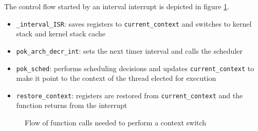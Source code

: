 The control flow started by an interval interrupt is depicted in figure \ref{fig:context switch flow}.
\begin{itemize}
  \item \texttt{\_interval\_ISR}: saves registers to \texttt{current\_context} and switches to kernel stack and kernel stack cache
  \item \texttt{pok\_arch\_decr\_int}: sets the next timer interval and calls the scheduler
  \item \texttt{pok\_sched}: performs scheduling decisions and updates \texttt{current\_context} to make it point to the context of the thread elected for execution
  \item \texttt{restore\_context}: registers are restored from \texttt{current\_context} and the function returns from the interrupt
\end{itemize}

	\begin{figure}[!ht]
		\begin{center}
		\end{center}
		\caption{Flow of function calls needed to perform a context switch}
		\label{fig:context switch flow}
	\end{figure}

